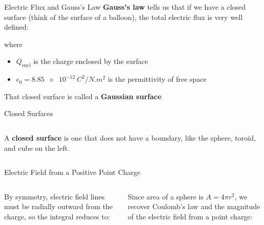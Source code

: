 \documentclass[12pt,aspectratio=169]{beamer}
\begin{document}
\begin{frame}{Electric Flux and Gauss's Law}
  \textbf{Gauss's law} tells us that if we have a closed surface (think of
  the surface of a balloon), the total electric flux is very well defined:

    
  where
  \begin{itemize}
  \item $Q_\text{encl}$ is the charge enclosed by the surface
  \item $\epsilon_0=\SI{8.85e-12}{C^2/N.m^2}$ is the permittivity of free space
  \end{itemize}
  That closed surface is called a \textbf{Gaussian surface}
\end{frame}



\begin{frame}{Closed Surfaces}
  \begin{columns}
    A \textbf{closed surface} is one that does not have a boundary, like the
    sphere, toroid, and cube on the left.
  \end{columns}
\end{frame}



\begin{frame}{Electric Field from a Positive Point Charge}
  \begin{columns}
    
    By symmetry, electric field lines must be radially outward from the charge,
    so the integral reduces to:


    Since area of a sphere is $A=4\pi r^2$, we recover Coulomb's law and the
    magnitude of the electric field from a point charge:

  \end{columns}
\end{frame}
\end{document}
